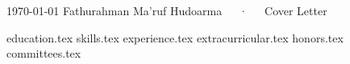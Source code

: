 \documentclass[12pt, a4paper]{awesome-cv}
\newif\ifResume
\newif\ifCoverLetter
\newcommand*{\sectiondir}{section/}
\newcommand{\texttype}{Curriculum Vitae}
\renewcommand{\texttype}{Resume}
\renewcommand{\texttype}{Cover Letter}
\newcommand{\fullname}{Fathurahman Ma'ruf Hudoarma}
\begin{document}
\makecvheader

\makecvfooter
    {\today}
    {\fullname~~~·~~~\texttype}
    {\ifCoverLetter \else \thepage \fi}

\ifCoverLetter
    \makelettertitle
\fi

\ifCoverLetter
    {coverletter.tex}
    \makeletterclosing
\else
    \ifResume
        {summary.tex}
        {experience.tex}
        {education.tex}
        {extracurricular.tex}
        {honors.tex}
        {committees.tex}
    \else
        {education.tex}
        {skills.tex}
        {experience.tex}
        {extracurricular.tex}
        {honors.tex}
        {committees.tex}
    \fi
\fi
\end{document}
